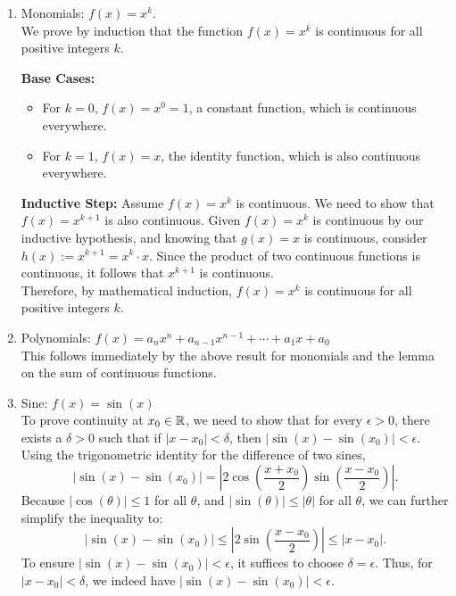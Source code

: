 \begin{enumerate}
\renewcommand{\labelenumi}{(\alph{enumi})}
\setlength{\itemsep}{.2cm}
\item Monomials: $f(x) = x^k$. \\

We prove by induction that the function $f(x) = x^k$ is continuous for all positive integers $k$.

\textbf{Base Cases:}
\begin{itemize}
    \item For $k=0$, $f(x) = x^0 = 1$, a constant function, which is continuous everywhere.
    \item For $k=1$, $f(x) = x$, the identity function, which is also continuous everywhere.
\end{itemize}

\textbf{Inductive Step:}
Assume $f(x) = x^k$ is continuous. We need to show that $f(x) = x^{k+1}$ is also continuous. Given $f(x) = x^k$ is continuous by our inductive hypothesis, and knowing that $g(x) = x$ is continuous, consider $h(x) := x^{k+1} = x^k \cdot x$. Since the product of two continuous functions is continuous, it follows that $x^{k+1}$ is continuous.\\

Therefore, by mathematical induction, $f(x) = x^k$ is continuous for all positive integers $k$.
\Qed

  \item Polynomials: $ f(x) = a_nx^n + a_{n-1}x^{n-1} + \cdots + a_1x + a_0 $\\

  This follows immediately by the above result for monomials and the lemma on the sum of continuous functions.

  
\item  Sine: $ f(x) = \sin(x) $ \\

To prove continuity at $x_0 \in \mathbb R$, we need to show that for every $\epsilon > 0$, there exists a $\delta > 0$ such that if $|x - x_0| < \delta$, then $|\sin(x) - \sin(x_0)| < \epsilon$.\\

Using the trigonometric identity for the difference of two sines, 
\[
|\sin(x) - \sin(x_0)| = |2 \cos\left(\frac{x + x_0}{2}\right) \sin\left(\frac{x - x_0}{2}\right)|.
\]
Because $|\cos(\theta)| \leq 1$ for all $\theta$, and $|\sin(\theta)| \leq |\theta|$ for all $\theta$, we can further simplify the inequality to:
\[
|\sin(x) - \sin(x_0)| \leq |2 \sin\left(\frac{x - x_0}{2}\right)| \leq |x - x_0|.
\]
To ensure $|\sin(x) - \sin(x_0)| < \epsilon$, it suffices to choose $\delta = \epsilon$. Thus, for $|x - x_0| < \delta$, we indeed have $|\sin(x) - \sin(x_0)| < \epsilon$.\\


\end{enumerate}
